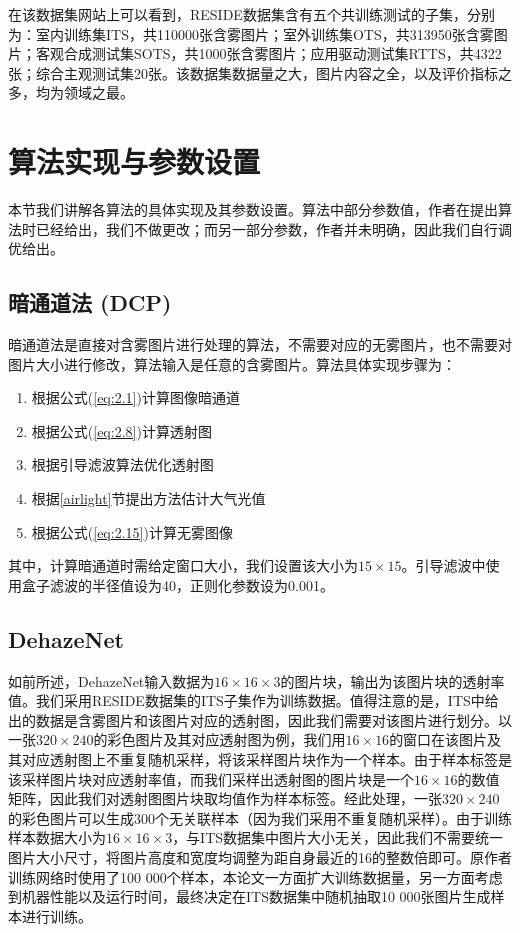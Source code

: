 \documentclass[a4paper, 12pt, oneside]{report}
\begin{document}
{在该数据集网站上可以看到，RESIDE数据集含有五个共训练测试的子集，分别为：室内训练集ITS，共110000张含雾图片；室外训练集OTS，共313950张含雾图片；客观合成测试集SOTS，共1000张含雾图片；应用驱动测试集RTTS，共4322张；综合主观测试集20张。该数据集数据量之大，图片内容之全，以及评价指标之多，均为领域之最。

\section{算法实现与参数设置\quad}
本节我们讲解各算法的具体实现及其参数设置。算法中部分参数值，作者在提出算法时已经给出，我们不做更改；而另一部分参数，作者并未明确，因此我们自行调优给出。

\subsection{暗通道法 (DCP)\quad}
	暗通道法是直接对含雾图片进行处理的算法，不需要对应的无雾图片，也不需要对图片大小进行修改，算法输入是任意的含雾图片。算法具体实现步骤为：
\begin{enumerate}
\item 根据公式(\ref{eq:2.1})计算图像暗通道
\item 根据公式(\ref{eq:2.8})计算透射图
\item 根据引导滤波算法优化透射图
\item 根据\ref{airlight}节提出方法估计大气光值
\item 根据公式(\ref{eq:2.15})计算无雾图像
\end{enumerate}

其中，计算暗通道时需给定窗口大小，我们设置该大小为$15\times 15$。引导滤波中使用盒子滤波的半径值设为40，正则化参数设为0.001。

\subsection{DehazeNet\quad}
如前所述，DehazeNet输入数据为$16 \times 16 \times 3$的图片块，输出为该图片块的透射率值。我们采用RESIDE数据集的ITS子集作为训练数据。值得注意的是，ITS中给出的数据是含雾图片和该图片对应的透射图，因此我们需要对该图片进行划分。以一张$320 \times 240$的彩色图片及其对应透射图为例，我们用$16 \times 16$的窗口在该图片及其对应透射图上不重复随机采样，将该采样图片块作为一个样本。由于样本标签是该采样图片块对应透射率值，而我们采样出透射图的图片块是一个$16 \times 16$的数值矩阵，因此我们对透射图图片块取均值作为样本标签。经此处理，一张$320 \times 240$的彩色图片可以生成300个无关联样本（因为我们采用不重复随机采样）。由于训练样本数据大小为$16 \times 16 \times 3$，与ITS数据集中图片大小无关，因此我们不需要统一图片大小尺寸，将图片高度和宽度均调整为距自身最近的16的整数倍即可。原作者训练网络时使用了100 000个样本，本论文一方面扩大训练数据量，另一方面考虑到机器性能以及运行时间，最终决定在ITS数据集中随机抽取10 000张图片生成样本进行训练。
	
}
\end{document}

